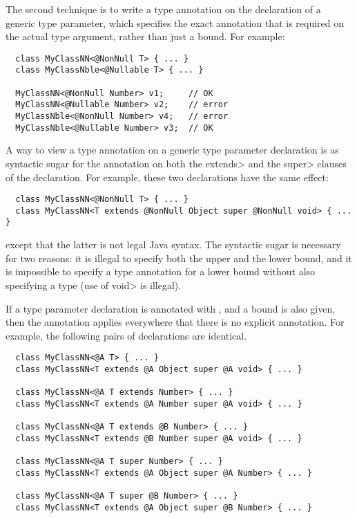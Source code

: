 The second technique is to write a type annotation on the declaration of a
generic type parameter, which specifies the exact annotation that is
required on the actual type argument, rather than just a bound.  For example:

\begin{Verbatim}
  class MyClassNN<@NonNull T> { ... }
  class MyClassNble<@Nullable T> { ... }

  MyClassNN<@NonNull Number> v1;     // OK
  MyClassNN<@Nullable Number> v2;    // error
  MyClassNble<@NonNull Number> v4;   // error
  MyClassNble<@Nullable Number> v3;  // OK
\end{Verbatim}

A way to view a type annotation on a generic type parameter declaration is
as syntactic sugar for the annotation on both the \<extends> and the
\<super> clauses of the declaration.  For example, these two declarations
have the same effect:

\begin{Verbatim}
  class MyClassNN<@NonNull T> { ... }
  class MyClassNN<T extends @NonNull Object super @NonNull void> { ... }
\end{Verbatim}

\noindent
except that the latter is not legal Java syntax.  The syntactic sugar is
necessary for two reasons:  it is illegal to specify both the upper and the
lower bound, and it is impossible to specify a type annotation for a lower
bound without also specifying a type (use of \<void> is illegal).

If a type parameter declaration is annotated with , and a bound is
also given, then the annotation applies everywhere that there is no
explicit annotation.  For example, the following pairs of declarations are
identical.

\begin{Verbatim}
  class MyClassNN<@A T> { ... }
  class MyClassNN<T extends @A Object super @A void> { ... }

  class MyClassNN<@A T extends Number> { ... }
  class MyClassNN<T extends @A Number super @A void> { ... }

  class MyClassNN<@A T extends @B Number> { ... }
  class MyClassNN<T extends @B Number super @A void> { ... }

  class MyClassNN<@A T super Number> { ... }
  class MyClassNN<T extends @A Object super @A Number> { ... }

  class MyClassNN<@A T super @B Number> { ... }
  class MyClassNN<T extends @A Object super @B Number> { ... }
\end{Verbatim}

